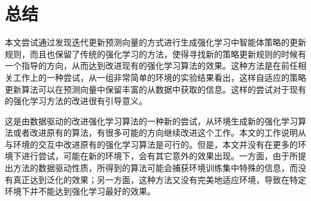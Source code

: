 \chapter{总结}
\label{cha:experiment}

本文尝试通过发现迭代更新预测向量的方式进行生成强化学习中智能体策略的更新规则，而且也保留了传统的强化学习的方法，使得寻找新的策略更新规则的时候有一个指导的方向，从而达到改进现有的强化学习算法的效果。这种方法是在前任相关工作上的一种尝试，从一组非常简单的环境的实验结果看出，这样自适应的策略更新算法可以在预测向量中保留丰富的从数据中获取的信息。这样的尝试对于现有的强化学习方法的改进很有引导意义。

这是由数据驱动的改进强化学习算法的一种新的尝试，从环境生成新的强化学习算法或者改进原有的算法，有很多可能的方向继续改进这个工作。本文的工作说明从与环境的交互中改进原有的强化学习算法是可行的。但是，本文并没有在更多的环境下进行尝试，可能在新的环境下，会有其它意外的效果出现。一方面，由于所提出方法的数据驱动性质，所得到的算法可能会捕获环境训练集中特殊的信息，而没有真正达到泛化的效果；另一方面，这种方法又没有完美地适应环境，导致在特定环境下并不能达到强化学习最好的效果。